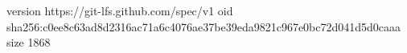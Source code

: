 version https://git-lfs.github.com/spec/v1
oid sha256:c0ee8c63ad8d2316ac71a6c4076ae37be39eda9821c967e0bc72d041d5d0caaa
size 1868
